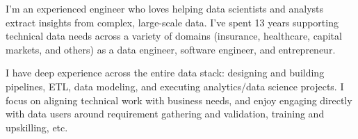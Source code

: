 

\begin{cvparagraph}


I'm an experienced engineer who loves helping data scientists and analysts extract insights from complex, large-scale data. I've spent 13 years supporting technical data needs across a variety of domains (insurance, healthcare, capital markets, and others) as a data engineer, software engineer, and entrepreneur.

I have deep experience across the entire data stack: designing and building pipelines, ETL, data modeling, and executing analytics/data science projects. I focus on aligning technical work with business needs, and enjoy engaging directly with data users around requirement gathering and validation, training and upskilling, etc.

\end{cvparagraph}
